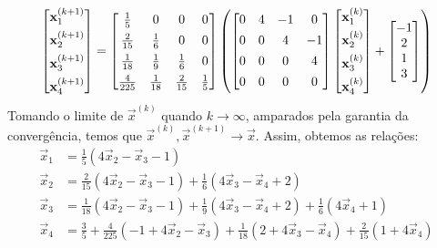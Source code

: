 \documentclass{homework}
\begin{document}
		$$\left[
		\begin{array}{@{}c@{}}
		\vec{x}_1^{(k+1)} \\[1ex]
		\vec{x}_2^{(k+1)} \\[1ex] 
		\vec{x}_3^{(k+1)} \\[1ex]
		\vec{x}_4^{(k+1)}
		\end{array}
		\right] = \left[
		\begin{array}{@{}cccc@{}}
		\frac{1}{5} & 0 & 0 & 0 \\[1ex]
		\frac{2}{15} & \frac{1}{6} & 0 & 0 \\[1ex]
		\frac{1}{18} & \frac{1}{9} & \frac{1}{6} & 0 \\[1ex]
		\frac{4}{225} & \frac{1}{18} & \frac{2}{15} & \frac{1}{5}
		\end{array}
		\right]\left(
		\left[
		\begin{array}{@{}cccc@{}}
		0 & 4 & -1 & 0 \\[1ex]
		0 & 0 & 4 & -1 \\[1ex]
		0 & 0 & 0 & 4 \\[1ex]
		0 & 0 & 0 & 0
		\end{array}
		\right]\left[
		\begin{array}{@{}c@{}}
		\vec{x}_1^{(k)} \\[1ex]
		\vec{x}_2^{(k)} \\[1ex] 
		\vec{x}_3^{(k)} \\[1ex]
		\vec{x}_4^{(k)}
		\end{array}
		\right] + \left[
		\begin{array}{@{}c@{}}
		-1 \\
		2 \\
		1 \\
		3 \\
		\end{array}
		\right]
		\right)
		$$
	Tomando o limite de $\vec{x}^{(k)}$ quando $k \to \infty$, amparados pela garantia da convergência, temos que $\vec{x}^{(k)}, \vec{x}^{(k+1)} \to \vec{x}$. Assim, obtemos as relações:
		\begin{align*}
			\vec{x}_1 &=\frac{1}{5} (4 \vec{x}_2-\vec{x}_3-1)\\
			\vec{x}_2 &=\frac{2}{15} (4 \vec{x}_2-\vec{x}_3-1)+\frac{1}{6} (4 \vec{x}_3-\vec{x}_4+2)\\
			\vec{x}_3 &=\frac{1}{18} (4 \vec{x}_2-\vec{x}_3-1)+\frac{1}{9} (4 \vec{x}_3-\vec{x}_4+2)+\frac{1}{6} (4 \vec{x}_4+1)\\
			\vec{x}_4 &= \frac{3}{5} + \frac{4}{225} (-1 + 4 \vec{x}_2 - \vec{x}_3) + \frac{1}{18} (2 + 4 \vec{x}_3 - \vec{x}_4) + \frac{2}{15} (1 + 4 \vec{x}_4)
		\end{align*}
\end{document}
